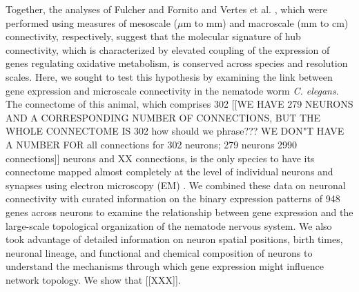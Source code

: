 \documentclass[10pt,letterpaper]{article}
\begin{document}
Together, the analyses of Fulcher and Fornito \cite{Fulcher:2016ck} and Vertes et al. \cite{Vertes2016a}, which were performed using measures of mesoscale ($\mu$m to mm) and macroscale (mm to cm) connectivity, respectively, suggest that the molecular signature of hub connectivity, which is characterized by elevated coupling of the expression of genes regulating oxidative metabolism, is conserved across species and resolution scales.
Here, we sought to test this hypothesis by examining the link between gene expression and microscale connectivity in the nematode worm \emph{C. elegans}.
The connectome of this animal, which comprises 302 [[WE HAVE 279 NEURONS AND A CORRESPONDING NUMBER OF CONNECTIONS, BUT THE WHOLE CONNECTOME IS 302 how should we phrase??? WE DON"T HAVE A NUMBER FOR all connections for 302 neurons; 279 neurons 2990 connections]] neurons and XX connections, is the only species to have its connectome mapped almost completely at the level of individual neurons and synapses using electron microscopy (EM) \cite{White:1986tx, Varshney2011}.
We combined these data on neuronal connectivity with curated information on the binary expression patterns of 948 genes across neurons to examine the relationship between gene expression and the large-scale topological organization of the nematode nervous system.
We also took advantage of detailed information on neuron spatial positions, birth times, neuronal lineage, and functional and chemical composition of neurons to understand the mechanisms through which gene expression might influence network topology.
We show that [[XXX]].
\end{document}
